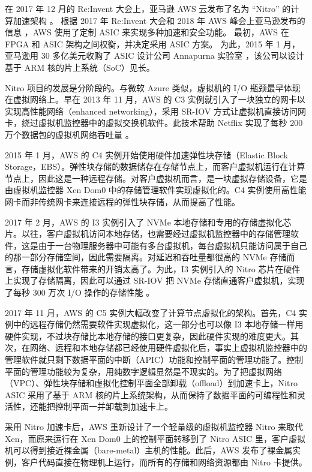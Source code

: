 在 2017 年 12 月的 Re:Invent 大会上，亚马逊 AWS 云发布了名为 ``Nitro'' 的计算加速架构 \cite{nitro-blog}。
根据 2017 年 Re:Invent 大会和 2018 年 AWS 峰会上亚马逊发布的信息 \cite{nitro-talk,nitro-web}，AWS 使用了定制 ASIC 来实现多种加速和安全功能。
最初，AWS 在 FPGA 和 ASIC 架构之间权衡，并决定采用 ASIC 方案。
为此，2015 年 1 月，亚马逊用 30 多亿美元收购了 ASIC 设计公司 Annapurna 实验室 \cite{annapurna}，该公司以设计基于 ARM 核的片上系统（SoC）见长。

Nitro 项目的发展是分阶段的。与微软 Azure 类似，虚拟机的 I/O 瓶颈最早体现在虚拟网络上。早在 2013 年 11 月，AWS 的 C3 实例就引入了一块独立的网卡以实现高性能网络（enhanced networking），采用 SR-IOV 方式让虚拟机直接访问网卡，绕过虚拟机监控器中的虚拟交换机软件。此技术帮助 Netflix 实现了每秒 200 万个数据包的虚拟机网络吞吐量 \cite{netflix-aws}。

2015 年 1 月，AWS 的 C4 实例开始使用硬件加速弹性块存储（Elastic Block Storage，EBS）。弹性块存储的数据储存在存储节点上，而客户虚拟机运行在计算节点上，因此这是一种远程存储。对客户虚拟机而言，是一块虚拟存储设备，它是由虚拟机监控器 Xen Dom0 中的存储管理软件实现虚拟化的。C4 实例使用高性能网卡而非传统网卡来连接远程的弹性块存储，从而提高了性能。

2017 年 2 月，AWS 的 I3 实例引入了 NVMe 本地存储和专用的存储虚拟化芯片。以往，客户虚拟机访问本地存储，也需要经过虚拟机监控器中的存储管理软件，这是由于一台物理服务器中可能有多台虚拟机，每台虚拟机只能访问属于自己的那一部分存储空间，因此需要隔离。对延迟和吞吐量都很高的 NVMe 存储而言，存储虚拟化软件带来的开销太高了。为此，I3 实例引入的 Nitro 芯片在硬件上实现了存储隔离，因此可以通过 SR-IOV 把 NVMe 存储直通客户虚拟机，实现了每秒 300 万次 I/O 操作的存储性能 \cite{aws-local-storage}。

2017 年 11 月，AWS 的 C5 实例大幅改变了计算节点虚拟化的架构。首先，C4 实例中的远程存储仍然需要软件实现虚拟化，这一部分也可以像 I3 本地存储一样用硬件实现，不过块存储比本地存储的接口更复杂，因此硬件实现的难度更大。其次，在网络、远程和本地存储都已经使用硬件虚拟化后，事实上虚拟机监控器中的管理软件就只剩下数据平面的中断（APIC）功能和控制平面的管理功能了。控制平面的管理功能较为复杂，用纯数字逻辑显然是不现实的。为了把虚拟网络（VPC）、弹性块存储和虚拟化控制平面全部卸载（offload）到加速卡上，Nitro ASIC 采用了基于 ARM 核的片上系统架构，从而保持了数据平面的可编程性和灵活性，还能把控制平面一并卸载到加速卡上。

采用 Nitro 加速卡后，AWS 重新设计了一个轻量级的虚拟机监控器 Nitro 来取代 Xen，而原来运行在 Xen Dom0 上的控制平面转移到了 Nitro ASIC 里，客户虚拟机可以得到接近裸金属（bare-metal）主机的性能。此后，AWS 发布了裸金属实例，客户代码直接在物理机上运行，而所有的存储和网络资源都由 Nitro 卡提供。

